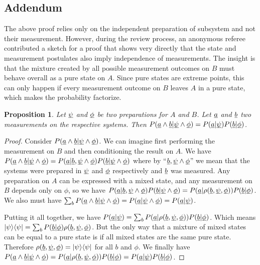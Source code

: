 \documentclass[aps,prl,amsmath,amssymb,twocolumn,nofootinbib]{revtex4}
\theoremstyle{plain}
\newtheorem{prop}[thrm]{Proposition}
\theoremstyle{definition}
\theoremstyle{remark}
\newcommand{\pj}[1] {\underbar{$#1$}}
\def\>{\rangle}
\def\<{\langle}
\begin{document}
	\subsection{Addendum}
	
	The above proof relies only on the independent preparation of subsystem and not their measurement. However, during the review process, an anonymous referee contributed a sketch for a proof that shows very directly that the state and measurement postulates also imply independence of measurements. The insight is that the mixture created by all possible measurement outcomes on $B$ must behave overall as a pure state on $A$. Since pure states are extreme points, this can only happen if every measurement outcome on $B$ leaves $A$ in a pure state, which makes the probability factorize.
	
	\begin{prop}
		Let $\pj{\psi}$ and $\pj{\phi}$ be two preparations for $A$ and $B$. Let $\pj{a}$ and $\pj{b}$ two measurements on the respective systems. Then $P(\pj{a} \wedge \pj{b} | \pj{\psi} \wedge \pj{\phi}) = P(\pj{a} | \pj{\psi}) P(\pj{b} | \pj{\phi})$.
	\end{prop}
	\begin{proof}
		Consider $P(\pj{a} \wedge \pj{b} | \pj{\psi} \wedge \pj{\phi})$. We can imagine first performing the measurement on $B$ and then conditioning the result on $A$. We have $P(\pj{a} \wedge \pj{b} | \pj{\psi} \wedge \pj{\phi}) = P(\pj{a} | \pj{b}, \pj{\psi} \wedge \pj{\phi}) P(\pj{b} | \pj{\psi} \wedge \pj{\phi})$ where by ``$\pj{b}, \pj{\psi} \wedge \pj{\phi}$'' we mean that the systems were prepared in $\pj{\psi}$ and $\pj{\phi}$ respectively and $\pj{b}$ was measured. Any preparation on $A$ can be expressed with a mixed state, and any measurement on $B$ depends only on $\phi$, so we have $P(\pj{a} | \pj{b}, \pj{\psi} \wedge \pj{\phi}) P(\pj{b} | \pj{\psi} \wedge \pj{\phi}) = P(\pj{a} | \rho(\pj{b}, \pj{\psi}, \pj{\phi})) P(\pj{b} | \pj{\phi})$. We also must have $\sum_b P(\pj{a} \wedge \pj{b} | \pj{\psi} \wedge \pj{\phi}) = P(\pj{a} | \pj{\psi} \wedge \pj{\phi}) = P(\pj{a} | \pj{\psi})$.
		
		Putting it all together, we have $P(\pj{a} | \pj{\psi}) = \sum_b P(\pj{a} | \rho(\pj{b}, \pj{\psi}, \pj{\phi})) P(\pj{b} | \pj{\phi})$. Which means $|\psi\>\<\psi| = \sum_b P(\pj{b} | \pj{\phi}) \rho(\pj{b}, \pj{\psi}, \pj{\phi})$. But the only way that a mixture of mixed states can be equal to a pure state is if all mixed states are the same pure state. Therefore $\rho(\pj{b}, \pj{\psi}, \pj{\phi}) = |\psi\>\<\psi|$ for all $b$ and $\phi$. We finally have $P(\pj{a} \wedge \pj{b} | \pj{\psi} \wedge \pj{\phi}) = P(\pj{a} | \rho(\pj{b}, \pj{\psi}, \pj{\phi})) P(\pj{b} | \pj{\phi}) = P(\pj{a} | \pj{\psi}) P(\pj{b} | \pj{\phi})$.
	\end{proof}
	
\end{document}

